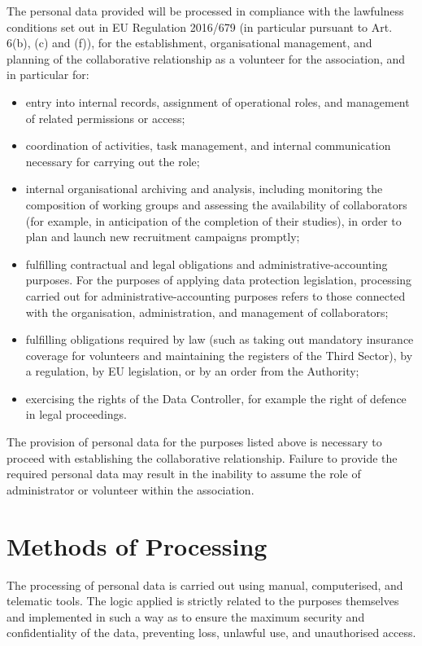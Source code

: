 \documentclass[legal]{polinetwork}
\begin{document}
The personal data provided will be processed in compliance with the lawfulness conditions set out in EU Regulation 2016/679 (in particular pursuant to Art. 6(b), (c) and (f)), for the establishment, organisational management, and planning of the collaborative relationship as a volunteer for the association, and in particular for:

\begin{itemize}
	\item entry into internal records, assignment of operational roles, and management of related permissions or access;
	\item coordination of activities, task management, and internal communication necessary for carrying out the role;
	\item internal organisational archiving and analysis, including monitoring the composition of working groups and assessing the availability of collaborators (for example, in anticipation of the completion of their studies), in order to plan and launch new recruitment campaigns promptly;
	\item fulfilling contractual and legal obligations and administrative-accounting purposes. For the purposes of applying data protection legislation, processing carried out for administrative-accounting purposes refers to those connected with the organisation, administration, and management of collaborators;
	\item fulfilling obligations required by law (such as taking out mandatory insurance coverage for volunteers and maintaining the registers of the Third Sector), by a regulation, by EU legislation, or by an order from the Authority;
	\item exercising the rights of the Data Controller, for example the right of defence in legal proceedings.
\end{itemize}

The provision of personal data for the purposes listed above is necessary to proceed with establishing the collaborative relationship. Failure to provide the required personal data may result in the inability to assume the role of administrator or volunteer within the association.

\section{Methods of Processing}

The processing of personal data is carried out using manual, computerised, and telematic tools. The logic applied is strictly related to the purposes themselves and implemented in such a way as to ensure the maximum security and confidentiality of the data, preventing loss, unlawful use, and unauthorised access.
\end{document}
